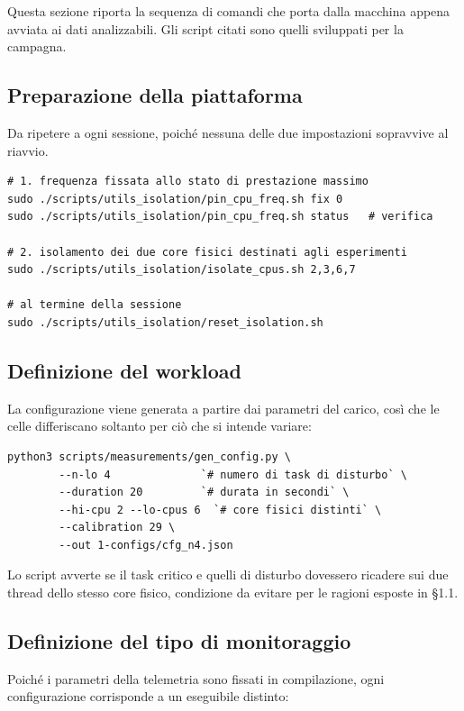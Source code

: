 \documentclass[11pt,a4paper]{article}
\begin{document}
Questa sezione riporta la sequenza di comandi che porta dalla macchina appena avviata ai dati
analizzabili. Gli script citati sono quelli sviluppati per la campagna.

\subsection{Preparazione della piattaforma}

Da ripetere a ogni sessione, poich\'e nessuna delle due impostazioni sopravvive al riavvio.

\begin{lstlisting}
# 1. frequenza fissata allo stato di prestazione massimo
sudo ./scripts/utils_isolation/pin_cpu_freq.sh fix 0
sudo ./scripts/utils_isolation/pin_cpu_freq.sh status   # verifica

# 2. isolamento dei due core fisici destinati agli esperimenti
sudo ./scripts/utils_isolation/isolate_cpus.sh 2,3,6,7

# al termine della sessione
sudo ./scripts/utils_isolation/reset_isolation.sh
\end{lstlisting}

\subsection{Definizione del workload}

La configurazione viene generata a partire dai parametri del carico, cos\`i che le celle differiscano
soltanto per ci\`o che si intende variare:

\begin{lstlisting}
python3 scripts/measurements/gen_config.py \
        --n-lo 4              `# numero di task di disturbo` \
        --duration 20         `# durata in secondi` \
        --hi-cpu 2 --lo-cpus 6  `# core fisici distinti` \
        --calibration 29 \
        --out 1-configs/cfg_n4.json
\end{lstlisting}

Lo script avverte se il task critico e quelli di disturbo dovessero ricadere sui due thread dello
stesso core fisico, condizione da evitare per le ragioni esposte in \S1.1.

\subsection{Definizione del tipo di monitoraggio}

Poich\'e i parametri della telemetria sono fissati in compilazione, ogni configurazione corrisponde
a un eseguibile distinto:
\end{document}

